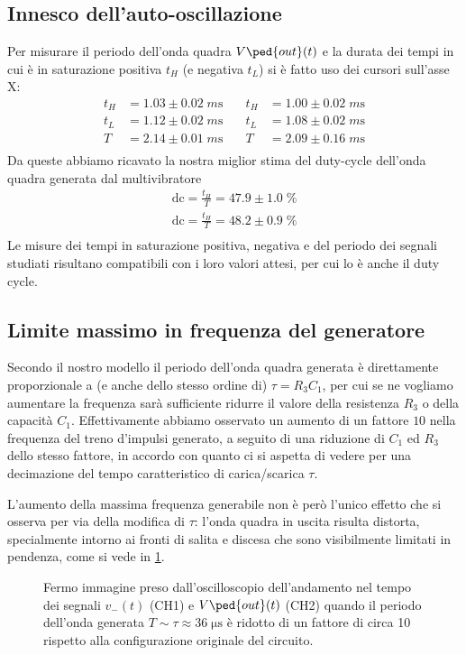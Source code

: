 \documentclass[10pt, a4paper, italian]{article}
\begin{document}
\subsection{Innesco dell'auto-oscillazione}
Per misurare il periodo dell'onda quadra $V\ped{out} (t)$ e la durata dei
tempi in cui è in saturazione positiva $t_H$ (e negativa $t_L$) si è fatto
uso dei cursori sull'asse X:
\begin{align*}
t_H &= 1.03 \pm 0.02 \; \si{m\s} &\quad t_H &= 1.00 \pm 0.02 \; \si{m\s} \\
t_L &= 1.12 \pm 0.02 \; \si{m\s} &\quad t_L &= 1.08 \pm 0.02 \; \si{m\s} \\
T &= 2.14 \pm 0.01 \; \si{m\s}  &\quad T &= 2.09 \pm 0.16 \; \si{m\s} \\
\end{align*}
Da queste abbiamo ricavato la nostra miglior stima del duty-cycle dell'onda
quadra generata dal multivibratore
\begin{align*}
\mathrm{dc} = \frac{t_H}{T} = 47.9 \pm 1.0 \; \% \\
\mathrm{dc} = \frac{t_H}{T} = 48.2 \pm 0.9 \; \% \\
\end{align*}
Le misure dei tempi in saturazione positiva, negativa e del periodo dei
segnali studiati risultano compatibili con i loro valori attesi, per cui
lo è anche il duty cycle.

\subsection{Limite massimo in frequenza del generatore}
Secondo il nostro modello il periodo dell'onda quadra generata è direttamente
proporzionale a (e anche dello stesso ordine di) $\tau = R_3 C_1$, per cui
se ne vogliamo aumentare la frequenza sarà sufficiente ridurre il valore
della resistenza $R_3$ o della capacità $C_1$. Effettivamente abbiamo osservato
un aumento di un fattore $10$ nella frequenza del treno d'impulsi generato,
a seguito di una riduzione di $C_1$ ed $R_3$ dello stesso fattore, in accordo
con quanto ci si aspetta di vedere per una decimazione del tempo caratteristico
di carica/scarica $\tau$.

L'aumento della massima frequenza generabile non è però l'unico effetto che
si osserva per via della modifica di $\tau$: l'onda quadra in uscita risulta
distorta, specialmente intorno ai fronti di salita e discesa che sono
visibilmente limitati in pendenza, come si vede in \cref{fig: astable1nF}.
\begin{figure}[htbp]
	\centering
	\caption{Fermo immagine preso dall'oscilloscopio dell'andamento nel tempo dei
	segnali $v_- (t)$ (CH1) e $V\ped{out} (t)$ (CH2) quando il periodo dell'onda
	generata $T \sim \tau \approx 36 \; \si{\micro\s}$ è ridotto di un fattore di
	circa 10 rispetto alla configurazione originale del circuito.
	\label{fig: astable1nF}}
\end{figure}
\end{document}
